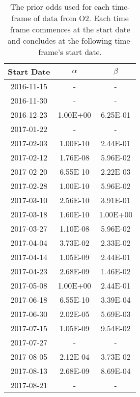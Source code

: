 \begin{table}
\centering
\caption[The prior odd]{The prior odds used for each time-frame of data from O2. Each time frame commences at the start date and concludes at the following time-frame's start date.
    }
\label{tab:priorodds}
\def\arraystretch{1.5} 
\setlength{\tabcolsep}{0.5em}
\begin{tabular}{c|cc}

Start Date & $\alpha$ &  $\beta$ \\
\midrule
2016-11-15 &        - &        - \\
2016-11-30 &        - &        - \\
2016-12-23 & 1.00E+00 & 6.25E-01 \\
2017-01-22 &        - &        - \\
2017-02-03 & 1.00E-10 & 2.44E-01 \\
2017-02-12 & 1.76E-08 & 5.96E-02 \\
2017-02-20 & 6.55E-10 & 2.22E-03 \\
2017-02-28 & 1.00E-10 & 5.96E-02 \\
2017-03-10 & 2.56E-10 & 3.91E-01 \\
2017-03-18 & 1.60E-10 & 1.00E+00 \\
2017-03-27 & 1.10E-08 & 5.96E-02 \\
2017-04-04 & 3.73E-02 & 2.33E-02 \\
2017-04-14 & 1.05E-09 & 2.44E-01 \\
2017-04-23 & 2.68E-09 & 1.46E-02 \\
2017-05-08 & 1.00E+00 & 2.44E-01 \\
2017-06-18 & 6.55E-10 & 3.39E-04 \\
2017-06-30 & 2.02E-05 & 5.69E-03 \\
2017-07-15 & 1.05E-09 & 9.54E-02 \\
2017-07-27 &        - &        - \\
2017-08-05 & 2.12E-04 & 3.73E-02 \\
2017-08-13 & 2.68E-09 & 8.69E-04 \\
2017-08-21 &        - &        - \\

\end{tabular}
\end{table}